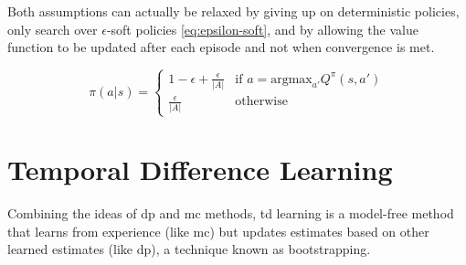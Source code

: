 Both assumptions can actually be relaxed by giving up on deterministic policies, only search over
$\epsilon$-soft policies \ref{eq:epsilon-soft}, and by allowing the value function to be updated after each episode and 
not when convergence is met.

\begin{equation}
    \pi(a|s)=\left\{
    \begin{array}{ll}
    1-\epsilon+\frac{\epsilon}{|A|} & \mbox{if $a=\mbox{argmax}_{a'}Q^{\pi}(s,a')$} \\
    \frac{\epsilon}{|A|} & \mbox{otherwise}
    \end{array}
    \right.
    \label{eq:epsilon-soft}
\end{equation}


    
    

\section{Temporal Difference Learning}
Combining the ideas of \gls{dp} and \gls{mc} methods, \gls{td} learning is a model-free method that 
learns from experience (like \gls{mc}) but updates estimates based on other learned estimates 
(like \gls{dp}), a technique known as bootstrapping.


